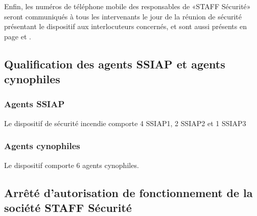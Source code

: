 \documentclass[hidelinks, paper=a4, fontsize=13pt]{report}
\begin{document}
Enfin, les numéros de téléphone mobile des responsables de «STAFF Sécurité» seront communiqués à tous les intervenants le jour de la réunion de sécurité présentant le dispositif aux interlocuteurs concernés, et sont aussi présents en page \pageref{refTelPC} et \pageref{refTelOrgas}.

\subsection{Qualification des agents SSIAP et agents cynophiles}


\subsubsection{Agents SSIAP}

Le dispositif de sécurité incendie comporte 4 SSIAP1, 2 SSIAP2  et 1 SSIAP3

\subsubsection{Agents cynophiles}

Le dispositif comporte 6 agents cynophiles.

\subsection{Arrêté d’autorisation de fonctionnement de la société STAFF Sécurité}
\end{document}
